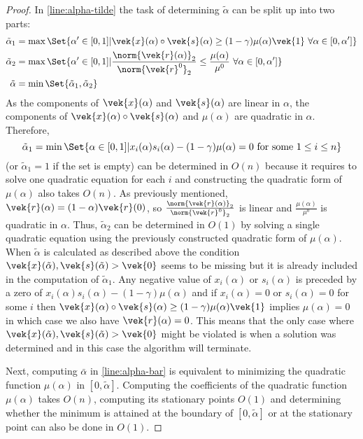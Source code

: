 \begin{proof}
  In \cref{line:alpha-tilde} the task of determining \(\tilde{\alpha}\) can be split up into two parts:
  \begin{align*}
    \tilde{\alpha}_1 &= \max \Set{\alpha' \in [0, 1] | \vek{x}(\alpha) \circ \vek{s}(\alpha) \geq (1 - \gamma)\mu(\alpha) \vek{1} \ \forall \alpha \in [0, \alpha']} \\
    \tilde{\alpha}_2 &= \max \Set{\alpha' \in [0, 1] | \frac{\norm{\vek{r}(\alpha)}_2}{\norm{\vek{r}^0}_2} \leq \frac{\mu(\alpha)}{\mu^0} \ \forall \alpha \in [0, \alpha']} \\
    \tilde{\alpha} &= \min \Set{\tilde{\alpha}_1, \tilde{\alpha}_2}
  \end{align*}
  As the components of \(\vek{x}(\alpha)\) and \(\vek{s}(\alpha)\) are linear in \(\alpha\), the components of \(\vek{x}(\alpha) \circ \vek{s}(\alpha)\) and \(\mu(\alpha)\) are quadratic in \(\alpha\).
  Therefore,
  \[ \tilde{\alpha}_1 = \min \Set{ \alpha \in [0, 1] | x_i(\alpha) s_i(\alpha) - (1 - \gamma)\mu(\alpha) = 0 \text{ for some } 1 \leq i \leq n } \]
  (or \(\tilde{\alpha}_1 = 1\) if the set is empty) can be determined in \(O(n)\) because it requires to solve one quadratic equation for each \(i\) and constructing the quadratic form of \(\mu(\alpha)\) also takes \(O(n)\).
  As previously mentioned, \(\vek{r}(\alpha) = (1 - \alpha)\vek{r}(0)\), so \(\frac{\norm{\vek{r}(\alpha)}_2}{\norm{\vek{r}^0}_2}\) is linear and \(\frac{\mu(\alpha)}{\mu^0}\) is quadratic in \(\alpha\).
  Thus, \(\tilde{\alpha}_2\) can be determined in \(O(1)\) by solving a single quadratic equation using the previously constructed quadratic form of \(\mu(\alpha)\).
  When \(\tilde{\alpha}\) is calculated as described above the condition \(\vek{x}(\tilde{\alpha}), \vek{s}(\tilde{\alpha}) > \vek{0}\) seems to be missing but it is already included in the computation of \(\tilde{\alpha}_1\).
  Any negative value of \(x_i(\alpha)\) or \(s_i(\alpha)\) is preceded by a zero of \(x_i(\alpha) s_i(\alpha) - (1 - \gamma)\mu(\alpha)\) and if \(x_i(\alpha) = 0\) or \(s_i(\alpha) = 0\) for some \(i\) then \(\vek{x}(\alpha) \circ \vek{s}(\alpha) \geq (1 - \gamma)\mu(\alpha) \vek{1}\) implies \(\mu(\alpha) = 0\) in which case we also have \(\vek{r}(\alpha) = 0\).
  This means that the only case where \(\vek{x}(\tilde{\alpha}), \vek{s}(\tilde{\alpha}) > \vek{0}\) might be violated is when a solution was determined and in this case the algorithm will terminate.

  Next, computing \(\bar{\alpha}\) in \cref{line:alpha-bar} is equivalent to minimizing the quadratic function \(\mu(\alpha)\) in \([0, \tilde{\alpha}]\).
  Computing the coefficients of the quadratic function \(\mu(\alpha)\) takes \(O(n)\), computing its stationary points \(O(1)\) and determining whether the minimum is attained at the boundary of \([0, \tilde{\alpha}]\) or at the stationary point can also be done in \(O(1)\).


\end{proof}
